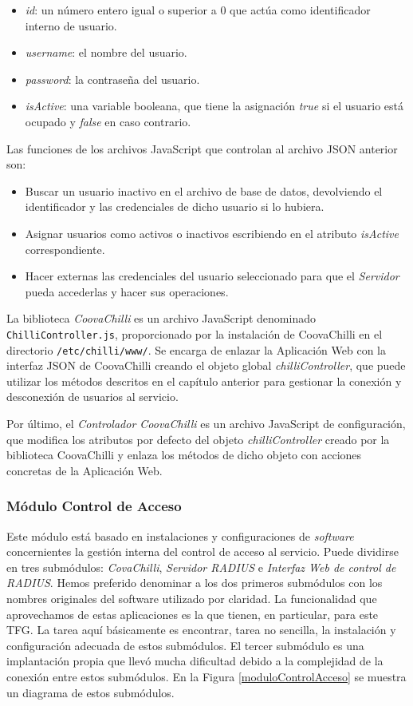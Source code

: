 \begin{itemize}
\item \emph{id}: un número entero igual o superior a 0 que actúa como identificador interno de usuario.
\item \emph{username}: el nombre del usuario.
\item \emph{password}: la contraseña del usuario.
\item \emph{isActive}: una variable booleana, que tiene la asignación \emph{true} si el usuario está ocupado y \emph{false} en caso contrario.
\end{itemize}

Las funciones de los archivos JavaScript que controlan al archivo JSON anterior son:

\begin{itemize}
\item Buscar un usuario inactivo en el archivo de base de datos, devolviendo el identificador y las credenciales de dicho usuario si lo hubiera.
\item Asignar usuarios como activos o inactivos escribiendo en el atributo \emph{isActive} correspondiente.
\item Hacer externas las credenciales del usuario seleccionado para que el \emph{Servidor} pueda accederlas y hacer sus operaciones.
\end{itemize}

La biblioteca \emph{CoovaChilli} es un archivo JavaScript denominado \verb+ChilliController.js+, proporcionado por la instalación de CoovaChilli en el directorio \verb+/etc/chilli/www/+. Se encarga de enlazar la Aplicación Web con la interfaz JSON de CoovaChilli creando el objeto global \emph{chilliController}, que puede utilizar los métodos descritos en el capítulo anterior para gestionar la conexión y desconexión de usuarios al servicio.

Por último, el \emph{Controlador CoovaChilli} es un archivo JavaScript de configuración, que modifica los atributos por defecto del objeto \emph{chilliController} creado por la biblioteca CoovaChilli y enlaza los métodos de dicho objeto con acciones concretas de la Aplicación Web.

\subsubsection{Módulo Control de Acceso}
Este módulo está basado en instalaciones y configuraciones de \emph{software} concernientes la gestión interna del control de acceso al servicio. Puede dividirse en tres submódulos: \emph{CovaChilli}, \emph{Servidor RADIUS} e \emph{Interfaz Web de control de RADIUS}. Hemos preferido denominar a los dos primeros submódulos con los nombres originales del software utilizado por claridad. La funcionalidad que aprovechamos de estas aplicaciones es la que tienen, en particular, para este TFG. La tarea aquí básicamente es encontrar, tarea no sencilla, la instalación y configuración adecuada de estos submódulos. El tercer submódulo es una implantación propia que llevó mucha dificultad debido a la complejidad de la conexión entre estos submódulos. En la Figura \ref{moduloControlAcceso} se muestra un diagrama de estos submódulos.

